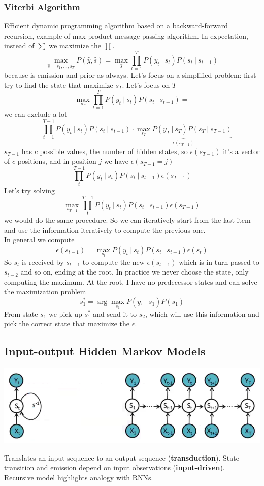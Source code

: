\documentclass[10pt]{report}
\begin{document}
\subsubsection{Viterbi Algorithm} Efficient dynamic programming algorithm based on a backward-forward recursion, example of max-product message passing algorithm. In expectation, instead of $\sum$ we maximize the $\prod$.
$$\max_{\hat{s} = s_1,\ldots,s_T} P(\hat{y},\hat{s}) = \max_{\hat{s}}\prod_{t=1}^T P(y_t\:|\:s_t)P(s_t\:|\:s_{t-1})$$
because is emission and prior as always. Let's focus on a simplified problem: first try to find the state that maximize $s_T$. Let's focus on $T$
$$\max_{s_T}\prod_{t=1}^T P(y_t\:|\:s_t)P(s_t\:|\:s_{t-1})=$$
we can exclude a lot
$$=\prod_{t=1}^{T-1} P(y_t\:|\:s_t)P(s_t\:|\:s_{t-1})\cdot\underset{\epsilon(s_{T-1})}{\underbrace{\max_{s_T}P(y_T\:|\:s_T)P(s_T\:|\:s_{T-1})}}$$
$s_{T-1}$ has $c$ possible values, the number of hidden states, so $\epsilon(s_{T-1})$ it's a vector of $c$ positions, and in position $j$ we have $\epsilon(s_{T-1} = j)$
$$\prod_t^{T-1} P(y_t\:|\:s_t)P(s_t\:|\:s_{t-1})\epsilon(s_{T-1})$$
Let's try solving 
$$\max_{s_{T-1}} \prod_t^{T-1} P(y_t\:|\:s_t)P(s_t\:|\:s_{t-1})\epsilon(s_{T-1})$$
we would do the same procedure. So we can iteratively start from the last item and use the information iteratively to compute the previous one.\\
In general we compute $$\epsilon(s_{t-1}) = \max_{s_t} P(y_t\:|\:s_t)P(s_t\:|\:s_{t-1})\epsilon(s_t)$$
So $s_t$ is received by $s_{t-1}$ to compute the new $\epsilon(s_{t-1})$ which is in turn passed to $s_{t-2}$ and so on, ending at the root. In practice we never choose the state, only computing the maximum. At the root, I have no predecessor states and can solve the maximization problem
$$s_1^* = \arg\max_{s_1}P(y_1\:|\:s_1)P(s_1)$$
From state $s_1$ we pick up $s_1^*$ and send it to $s_2$, which will use this information and pick the correct state that maximize the $\epsilon$.
\subsection{Input-output Hidden Markov Models}
\begin{center}
	\includegraphics[scale=0.5]{31.png}
\end{center}
Translates an input sequence to an output sequence (\textbf{transduction}). State transition and emission depend on input observations (\textbf{input-driven}).\\
Recursive model highlights analogy with RNNs.
\end{document}
